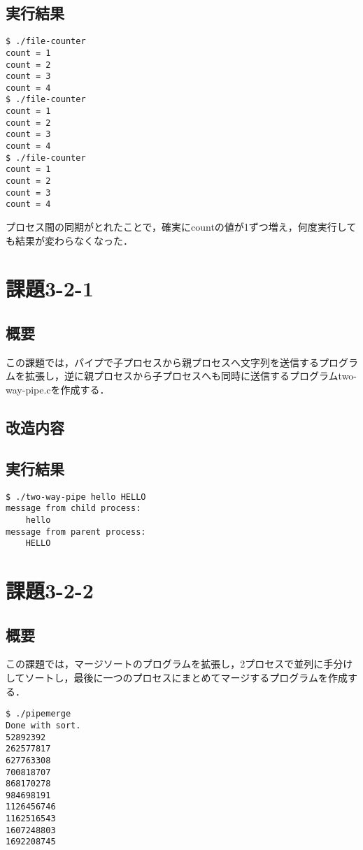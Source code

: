 \documentclass[a4j,10pt,titlepage]{jsarticle}
\begin{document}
\subsection{実行結果}
\begin{verbatim}
$ ./file-counter
count = 1
count = 2
count = 3
count = 4
$ ./file-counter
count = 1
count = 2
count = 3
count = 4
$ ./file-counter
count = 1
count = 2
count = 3
count = 4
\end{verbatim}

プロセス間の同期がとれたことで，確実にcountの値が1ずつ増え，何度実行しても結果が変わらなくなった．

\section{課題3-2-1}
\subsection{概要}
この課題では，パイプで子プロセスから親プロセスへ文字列を送信するプログラムを拡張し，逆に親プロセスから子プロセスへも同時に送信するプログラムtwo-way-pipe.cを作成する．
\subsection{改造内容}

\subsection{実行結果}
\begin{verbatim}
$ ./two-way-pipe hello HELLO
message from child process: 
	hello
message from parent process: 
	HELLO
\end{verbatim}

\section{課題3-2-2}
\subsection{概要}
この課題では，マージソートのプログラムを拡張し，2プロセスで並列に手分けしてソートし，最後に一つのプロセスにまとめてマージするプログラムを作成する．
\begin{verbatim}
$ ./pipemerge 
Done with sort.
52892392
262577817
627763308
700818707
868170278
984698191
1126456746
1162516543
1607248803
1692208745
\end{verbatim}
\end{document}
